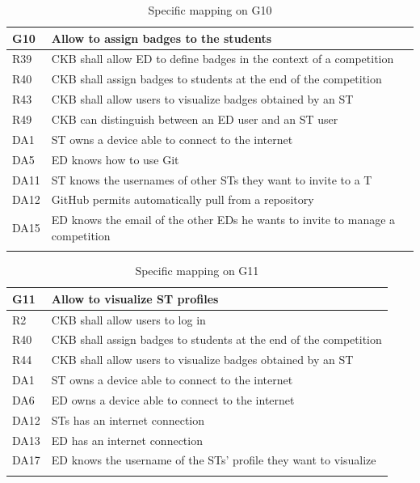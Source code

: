   \begin{longtable}{|l|p{12cm}|}
    \hline
    \textbf{G10} & \textbf{Allow to assign badges to the students}      \\
    \hline
    R39 & CKB shall allow ED to define badges in the context of a competition \\
    \hline
    R40 & CKB shall assign badges to students at the end of the competition \\
    \hline
    R43 & CKB shall allow users to visualize badges obtained by an ST \\
    \hline
    R49 & CKB can distinguish between an ED user and an ST user \\
    \hline
    DA1 & ST owns a device able to connect to the internet \\
    \hline
    DA5 & ED knows how to use Git \\
    \hline
    DA11 & ST knows the usernames of other STs they want to invite to a T \\
    \hline
    DA12 & GitHub permits automatically pull from a repository \\
    \hline
    DA15 & ED knows the email of the other EDs he wants to invite to manage a competition \\
    \hline

    \caption{Specific mapping on G10}
    \label{tab:mappingG10}
  \end{longtable}

  \begin{longtable}{|l|p{12cm}| }
    \hline
    \textbf{G11} & \textbf{Allow to visualize ST profiles}      \\
    \hline
    R2 & CKB shall allow users to log in \\
    \hline
    R40 & CKB shall assign badges to students at the end of the competition \\
    \hline
    R44 & CKB shall allow users to visualize badges obtained by an ST \\
    \hline
    DA1 & ST owns a device able to connect to the internet \\
    \hline
    DA6 & ED owns a device able to connect to the internet \\
    \hline
    DA12 & STs has an internet connection \\
    \hline
    DA13 & ED has an internet connection \\
    \hline
    DA17 & ED knows the username of the STs' profile they want to visualize \\
    \hline
    \caption{Specific mapping on G11}
    \label{tab:mappingG11}
  \end{longtable}


